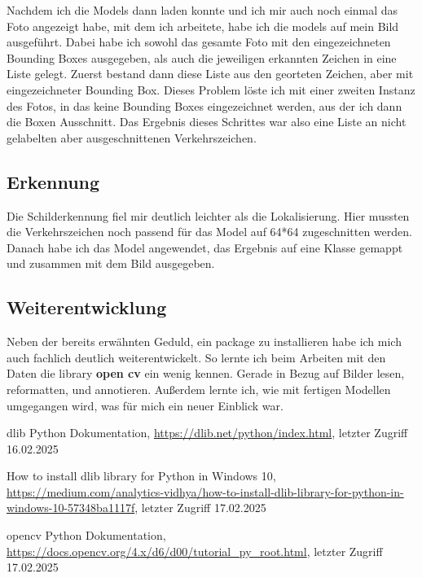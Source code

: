 \documentclass[runningheads]{llncs}
\begin{document}
Nachdem ich die Models dann laden konnte und ich mir auch noch einmal das Foto angezeigt habe, mit dem ich arbeitete, habe ich die models auf mein Bild ausgeführt. Dabei habe ich sowohl das gesamte Foto mit den eingezeichneten Bounding Boxes ausgegeben, als auch die jeweiligen erkannten Zeichen in eine Liste gelegt. Zuerst bestand dann diese Liste aus den georteten Zeichen, aber mit eingezeichneter Bounding Box. Dieses Problem löste ich mit einer zweiten Instanz des Fotos, in das keine Bounding Boxes eingezeichnet werden, aus der ich dann die Boxen Ausschnitt.
Das Ergebnis dieses Schrittes war also eine Liste an nicht gelabelten aber ausgeschnittenen Verkehrszeichen.

\subsection{Erkennung}
Die Schilderkennung fiel mir deutlich leichter als die Lokalisierung. Hier mussten die Verkehrszeichen noch passend für das Model auf 64*64 zugeschnitten werden. Danach habe ich das Model angewendet, das Ergebnis auf eine Klasse gemappt und zusammen mit dem Bild ausgegeben.

\subsection{Weiterentwicklung}
Neben der bereits erwähnten Geduld, ein package zu installieren habe ich mich auch fachlich deutlich weiterentwickelt. So lernte ich beim Arbeiten mit den Daten die library \textbf{open cv} ein wenig kennen. Gerade in Bezug auf Bilder lesen, reformatten, und annotieren. Außerdem lernte ich, wie mit fertigen Modellen umgegangen wird, was für mich ein neuer Einblick war.

\begin{thebibliography}{8}
  dlib Python Dokumentation, \url{https://dlib.net/python/index.html}, letzter Zugriff 16.02.2025

  How to install dlib library for Python in Windows 10, \url{https://medium.com/analytics-vidhya/how-to-install-dlib-library-for-python-in-windows-10-57348ba1117f}, letzter Zugriff 17.02.2025

  opencv Python Dokumentation, \url{https://docs.opencv.org/4.x/d6/d00/tutorial_py_root.html}, letzter Zugriff 17.02.2025
\end{thebibliography}
\end{document}
